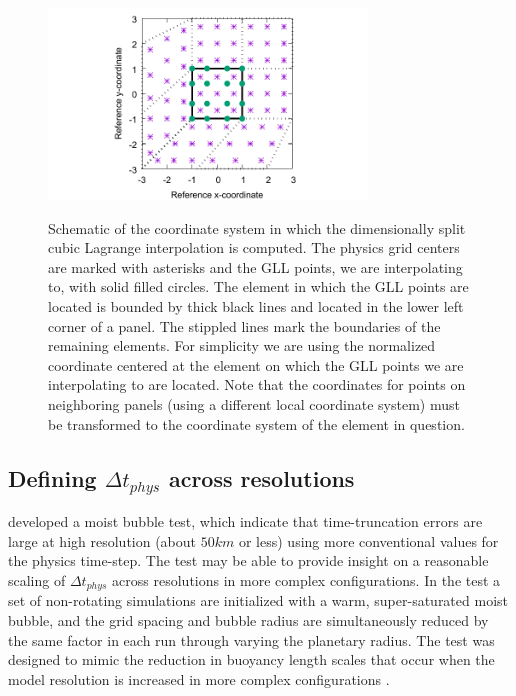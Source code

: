 \begin{figure}[t]
\begin{center}
\noindent\includegraphics[width=20pc,angle=0]{chapter4/mapping.pdf}\\
\end{center}
\caption{Schematic of the coordinate system in which the dimensionally split cubic Lagrange interpolation is computed.  The physics grid centers are marked with asterisks and the GLL points, we are interpolating to, with solid filled circles. The element in which the GLL points are located is  bounded by  thick black lines and located in the lower left corner of a panel. The stippled lines mark the boundaries of the remaining elements. For simplicity we are using the normalized coordinate centered at the element on which the GLL points we are interpolating to are located. Note that the coordinates for points on neighboring panels (using a different local coordinate system) must be transformed to the coordinate system of the element in question.}
\label{fig:mapping}
\end{figure}

\subsection{Defining $\Delta t_{phys}$ across resolutions}\label{sec:app1}
 \cite{HR2018JAMES} developed a moist bubble test, which indicate that time-truncation errors are large at high resolution (about $50km$ or less) using more conventional values for the physics time-step. The test may be able to provide insight on a reasonable scaling of $\Delta t_{phys}$ across resolutions in more complex configurations. In the test a set of non-rotating simulations are initialized with a warm, super-saturated moist bubble, and the grid spacing and bubble radius are simultaneously reduced by the same factor in each run through varying the planetary radius. The test was designed to mimic the reduction in buoyancy length scales that occur when the model resolution is increased in more complex configurations \citep{HETAL2006JCLIM,HR2018JAMES}. 
 
